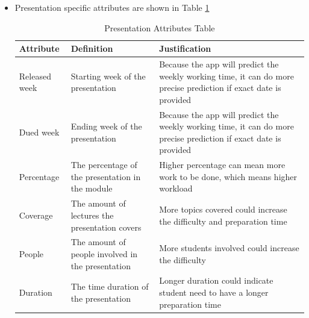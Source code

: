 \documentclass[fyp]{socreport}
\begin{document}
\begin{itemize}
	\item Presentation specific attributes are shown in Table {\ref{presentation-attribute}}
	\begin{table}[]
	\centering
	\begin{tabular}{|p{}|p{}|p{}|}
	\hline
		\rowcolor[HTML]{C0C0C0}
	  \textbf{Attribute} & \textbf{Definition} & \textbf{Justification} \\
	\hline
	Released week & Starting week of the presentation & Because the app will predict the weekly working time, it can do more precise prediction if exact date is provided \\
	\hline
	Dued week & Ending week of the presentation & Because the app will predict the weekly working time, it can do more precise prediction if exact date is provided \\
	\hline
	Percentage & The percentage of the presentation in the module & Higher percentage can mean more work to be done, which means higher workload \\
	\hline
	Coverage & The amount of lectures the presentation covers & More topics covered could increase the difficulty and preparation time \\
	\hline
	People & The amount of people involved in the presentation & More students involved could increase the difficulty \\
	\hline
	Duration & The time duration of the presentation & Longer duration could indicate student need to have a longer preparation time \\
	\hline
	\end{tabular}
	\caption{Presentation Attributes Table}
	\label{presentation-attribute}
	\end{table}


\end{itemize}
\end{document}
